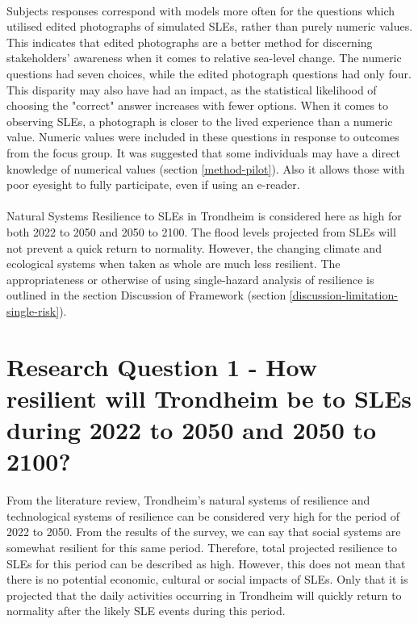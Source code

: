 \paragraph{}
Subjects responses correspond with models more often for the questions which utilised edited photographs of simulated SLEs, rather than purely numeric values. This indicates that edited photographs are a better method for discerning stakeholders' awareness when it comes to relative sea-level change. The numeric questions had seven choices, while the edited photograph questions had only four. This disparity may also have had an impact, as the statistical likelihood of choosing the "correct" answer increases with fewer options. When it comes to  observing SLEs, a photograph is closer to the lived experience than a numeric value. Numeric values were included in these questions in response to outcomes from the focus group. It was suggested that some individuals may have a direct knowledge of numerical values (section \ref{method-pilot}). Also it allows those with poor eyesight to fully participate, even if using an e-reader.
\paragraph{}
Natural Systems Resilience to SLEs in Trondheim is considered here as high for both 2022 to 2050 and 2050 to 2100. The flood levels projected from SLEs will not prevent a quick return to normality. However, the changing climate and ecological systems when taken as whole are much less resilient. The appropriateness or otherwise of using single-hazard analysis of resilience is outlined in the section Discussion of Framework (section \ref{discussion-limitation-single-risk}).


\section{Research Question 1 - How resilient will Trondheim be to SLEs during 2022 to 2050 and 2050 to 2100? } \label{RQ1-findings}
From the literature review, Trondheim's natural systems of resilience and technological systems of resilience can be considered very high for the period of 2022 to 2050. From the results of the survey,  we can say that social systems are somewhat resilient for this same period. Therefore, total projected resilience to SLEs for this period can be described as high. However, this does not mean that there is no potential economic, cultural or social impacts of SLEs. Only that it is projected that the daily activities occurring in Trondheim will quickly return to normality after the likely SLE events during this period.

